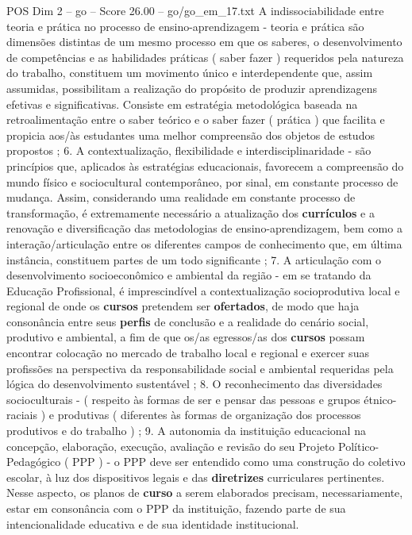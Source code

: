 \begin{textsample}{POS Dim 2 – go – Score 26.00 – go/go\_em\_17.txt}
A indissociabilidade entre teoria e prática no processo de ensino-aprendizagem - teoria e prática são dimensões distintas de um mesmo processo em que os saberes, o desenvolvimento de competências e as habilidades práticas ( saber fazer ) requeridos pela natureza do trabalho, constituem um movimento único e interdependente que, assim assumidas, possibilitam a realização do propósito de produzir aprendizagens efetivas e significativas.
Consiste em estratégia metodológica baseada na retroalimentação entre o saber teórico e o saber fazer ( prática ) que facilita e propicia aos/às estudantes uma melhor compreensão dos objetos de estudos propostos ; 6.
A contextualização, flexibilidade e interdisciplinaridade - são princípios que, aplicados às estratégias educacionais, favorecem a compreensão do mundo físico e sociocultural contemporâneo, por sinal, em constante processo de mudança.
Assim, considerando uma realidade em constante processo de transformação, é extremamente necessário a atualização dos \textbf{currículos} e a renovação e diversificação das metodologias de ensino-aprendizagem, bem como a interação/articulação entre os diferentes campos de conhecimento que, em última instância, constituem partes de um todo significante ; 7.
A articulação com o desenvolvimento socioeconômico e ambiental da região - em se tratando da Educação Profissional, é imprescindível a contextualização socioprodutiva local e regional de onde os \textbf{cursos} pretendem ser \textbf{ofertados}, de modo que haja consonância entre seus \textbf{perfis} de conclusão e a realidade do cenário social, produtivo e ambiental, a fim de que os/as egressos/as dos \textbf{cursos} possam encontrar colocação no mercado de trabalho local e regional e exercer suas profissões na perspectiva da responsabilidade social e ambiental requeridas pela lógica do desenvolvimento sustentável ; 8.
O reconhecimento das diversidades socioculturais - ( respeito às formas de ser e pensar das pessoas e grupos étnico-raciais ) e produtivas ( diferentes às formas de organização dos processos produtivos e do trabalho ) ; 9.
A autonomia da instituição educacional na concepção, elaboração, execução, avaliação e revisão do seu Projeto Político-Pedagógico ( PPP ) - o PPP deve ser entendido como uma construção do coletivo escolar, à luz dos dispositivos legais e das \textbf{diretrizes} curriculares pertinentes.
Nesse aspecto, os planos de \textbf{curso} a serem elaborados precisam, necessariamente, estar em consonância com o PPP da instituição, fazendo parte de sua intencionalidade educativa e de sua identidade institucional.

\end{textsample}
